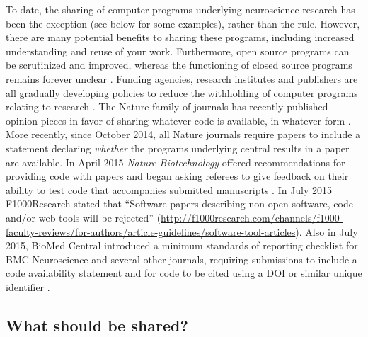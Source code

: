 \documentclass[11pt]{article}
\begin{document}
To date, the sharing of computer programs underlying neuroscience
research has been the exception (see below for some examples), rather
than the rule.  However, there are many potential benefits to sharing
these programs, including increased understanding and reuse of your
work.  Furthermore, open source programs can be scrutinized and
improved, whereas the functioning of closed source programs remains
forever unclear \cite{Vihinen2015}.  Funding agencies, research
institutes and publishers are all gradually developing policies to
reduce the withholding of computer programs relating to research
\cite{Morin2012-65e}.  The Nature family of journals has recently
published opinion pieces in favor of sharing whatever code is
available, in whatever form \cite{Barnes2010-iv,Ince2012-225}.  More
recently, since October 2014, all Nature journals require papers to
include a statement declaring \textit{whether} the programs underlying
central results in a paper are available. In April 2015 \textit{Nature
  Biotechnology} offered recommendations for providing code with
papers and began asking referees to give feedback on their ability to
test code that accompanies submitted manuscripts
\cite{NatBiotech2015}.  In July 2015 F1000Research stated that
``Software papers describing non-open software, code and/or web tools
will be rejected''
(\url{http://f1000research.com/channels/f1000-faculty-reviews/for-authors/article-guidelines/software-tool-articles}). Also
in July 2015, BioMed Central introduced a minimum standards of
reporting checklist for BMC Neuroscience and several other journals,
requiring submissions to include a code availability statement and for
code to be cited using a DOI or similar unique identifier
\cite{Kenall2015}.

\subsection*{What should be shared?}
\end{document}
